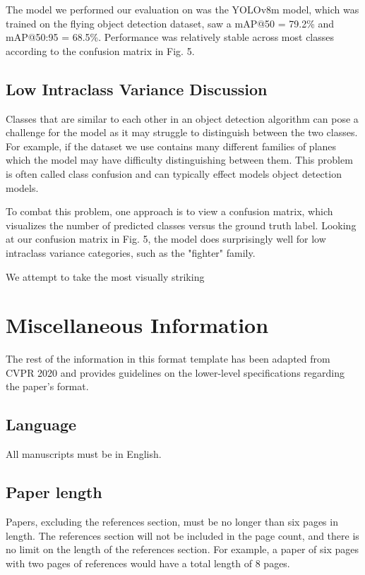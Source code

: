 \documentclass[10pt,twocolumn,letterpaper]{article}
\begin{document}
The model we performed our evaluation on was the YOLOv8m model, which was trained on the flying object detection dataset, saw a mAP@50 = 79.2\% and mAP@50:95 = 68.5\%. Performance was relatively stable across most classes according to the confusion matrix in Fig. 5. 

\subsection{Low Intraclass Variance Discussion}

Classes that are similar to each other in an object detection algorithm can pose a challenge for the model as it may struggle to distinguish between the two classes. For example, if the dataset we use contains many different families of planes which the model may have difficulty distinguishing between them. This problem is often called class confusion and can typically effect models object detection models.

To combat this problem, one approach is to view a confusion matrix, which visualizes the number of predicted classes versus the ground truth label. Looking at our confusion matrix in Fig. 5, the model does surprisingly well for low intraclass variance categories, such as the "fighter" family. 

We attempt to take the most visually striking


\section{Miscellaneous Information}

The rest of the information in this format template has been adapted from CVPR 2020 and provides guidelines on the lower-level specifications regarding the paper's format.

\subsection{Language}

All manuscripts must be in English.


\subsection{Paper length}
Papers, excluding the references section,
must be no longer than six pages in length. The references section
will not be included in the page count, and there is no limit on the
length of the references section. For example, a paper of six pages
with two pages of references would have a total length of 8 pages.
\end{document}
